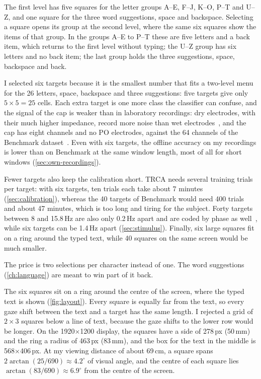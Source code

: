 The first level has five squares for the letter groups A--E, F--J, K--O, P--T and U--Z,
and one square for the three word suggestions, space and backspace. Selecting a square
opens its group at the second level, where the same six squares show the items of that
group. In the groups A--E to P--T these are five letters and a back item, which returns
to the first level without typing; the U--Z group has six letters and no back item; the
last group holds the three suggestions, space, backspace and back.

I selected six targets because it is the smallest number that fits a two-level menu for
the 26 letters, space, backspace and three suggestions: five targets give only
$5 \times 5 = 25$ cells.
Each extra target is one more class the classifier can confuse, and the signal of the
cap is weaker than in laboratory recordings: dry electrodes, with their much higher
impedance, record more noise than wet electrodes~\citep{mathewson2017dry}, and the cap
has eight channels and no PO electrodes, against the 64 channels of the Benchmark
dataset~\citep{wang2017benchmark}.
Even with six targets, the offline accuracy on my recordings is lower than on Benchmark
at the same window length, most of all for short windows (\cref{sec:own-recordings}).

Fewer targets also keep the calibration short. \ac{TRCA} needs several training trials
per target: with six targets, ten trials each take about 7 minutes
(\cref{sec:calibration}), whereas the 40 targets of Benchmark would need 400 trials and
about 47 minutes, which is too long and tiring for the subject.
Forty targets between 8 and 15.8\,Hz are also only 0.2\,Hz apart and are coded by
phase as well~\citep{chen2015highspeed}, while six targets can be 1.4\,Hz apart
(\cref{sec:stimulus}).
Finally, six large squares fit on a ring around the typed text, while 40 squares on
the same screen would be much smaller.

The price is two selections per character instead of one. The word suggestions
(\cref{ch:language}) are meant to win part of it back.

The six squares sit on a ring around the centre of the screen, where the typed text is
shown (\cref{fig:layout}). Every square is equally far from the text, so every gaze
shift between the text and a target has the same length. I rejected a grid of
$2 \times 3$ squares below a line of text, because the gaze shifts to the lower row
would be longer. On the 1920$\times$1200 display, the squares have a side of 278\,px
(50\,mm) and the ring a radius of 463\,px (83\,mm), and the box for the text in the
middle is 568$\times$406\,px.
At my viewing distance of about 69\,cm, a square spans $2\arctan(25/690) \approx
4.2^\circ$ of visual angle, and the centre of each square lies $\arctan(83/690) \approx
6.9^\circ$ from the centre of the screen.

